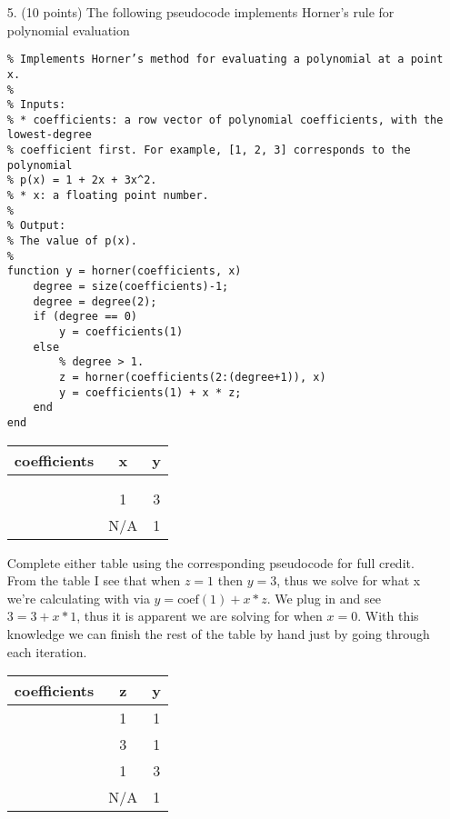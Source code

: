 \documentclass{article}
\begin{document}
\begin{enumerate}
    \newpage
    \item[5.] (10 points) The following pseudocode implements Horner’s rule for polynomial evaluation
    \begin{verbatim}
% Implements Horner’s method for evaluating a polynomial at a point x.
%
% Inputs:
% * coefficients: a row vector of polynomial coefficients, with the lowest-degree
% coefficient first. For example, [1, 2, 3] corresponds to the polynomial
% p(x) = 1 + 2x + 3x^2.
% * x: a floating point number.
%
% Output:
% The value of p(x).
%
function y = horner(coefficients, x)
    degree = size(coefficients)-1;
    degree = degree(2);
    if (degree == 0)
        y = coefficients(1)
    else
        % degree > 1.
        z = horner(coefficients(2:(degree+1)), x)
        y = coefficients(1) + x * z;
    end
end
    \end{verbatim}
    \begin{tabular}{ c|c|c } 
        coefficients & x & y \\ 
        \hline
        [1, 1, 3, 1] &  &  \\
        \hline
        [1, 3, 1] &  & \\ 
        \hline
        [3, 1] & 1 & 3 \\
        \hline
        [1] & N/A & 1
    \end{tabular}\newline
    Complete either table using the corresponding pseudocode for full credit.
    \newline
    \newline
    From the table I see that when $z = 1$ then $y=3$, thus we solve for what x we're calculating with via $y = \text{coef}(1) + x * z$. We plug in and see $3 = 3 + x * 1$, thus it is apparent we are solving for when $x = 0$. With this knowledge we can finish the rest of the table by hand just by going through each iteration. \newline\newline
    \begin{tabular}{ c|c|c } 
        coefficients & z & y \\ 
        \hline
        [1, 1, 3, 1] & 1 & 1 \\
        \hline
        [1, 3, 1] & 3 & 1\\ 
        \hline
        [3, 1] & 1 & 3 \\
        \hline
        [1] & N/A & 1
    \end{tabular}\newline
    

\end{enumerate}
\end{document}

